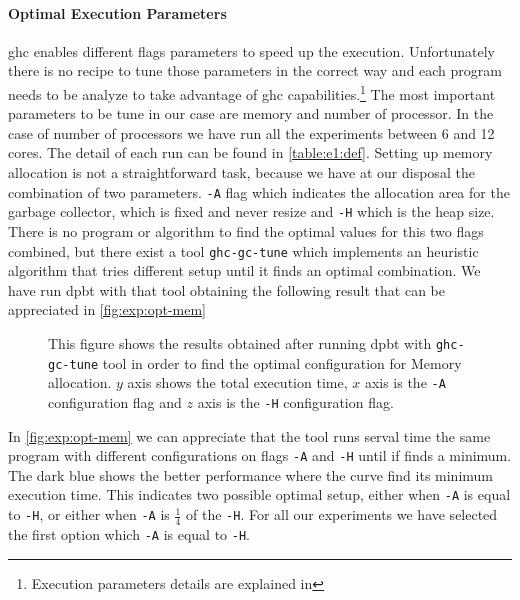 \paragraph{Optimal Execution Parameters}\label{par:ex:param} \acrshort{ghc} enables different flags parameters to speed up the execution. Unfortunately there is no recipe to tune those parameters in the correct way and each program needs to be analyze to take advantage of \acrshort{ghc} capabilities.\footnote{Execution parameters details are explained in }
The most important parameters to be tune in our case are memory and number of processor. In the case of number of processors we have run all the experiments between 6 and 12 cores. The detail of each run can be found in \autoref{table:e1:def}.
Setting up memory allocation is not a straightforward task, because we have at our disposal the combination of two parameters. \texttt{-A} flag which indicates the allocation area for the garbage collector, which is fixed and never resize and \texttt{-H} which is the heap size. There is no program or algorithm to find the optimal values for this two flags combined, but there exist a tool \texttt{ghc-gc-tune} \cite{ghctune} 
which implements an heuristic algorithm that tries different setup until it finds an optimal combination.
We have run \acrshort{dpbt} with that tool obtaining the following result that can be appreciated in \autoref{fig:exp:opt-mem}

\begin{figure}[h!]
  \centering  
\caption[{[EE] $\dpbt$ Finding Optimal Memory Setup}]{This figure shows the results obtained after running \acrshort{dpbt} with \texttt{ghc-gc-tune} tool in order to find the optimal configuration for Memory allocation. $y$ axis shows the total execution time, $x$ axis is the \texttt{-A} configuration flag and $z$ axis is the \texttt{-H} configuration flag.}
\label{fig:exp:opt-mem}
\end{figure}

In \autoref{fig:exp:opt-mem} we can appreciate that the tool runs serval time the same program with different configurations on flags \texttt{-A} and \texttt{-H} until if finds a minimum. The dark blue shows the better performance where the curve find its minimum execution time. 
This indicates two possible optimal setup, either when \texttt{-A} is equal to \texttt{-H}, or either when \texttt{-A} is $\frac{1}{4}$ of the \texttt{-H}. For all our experiments we have selected the first option which \texttt{-A} is equal to \texttt{-H}.

